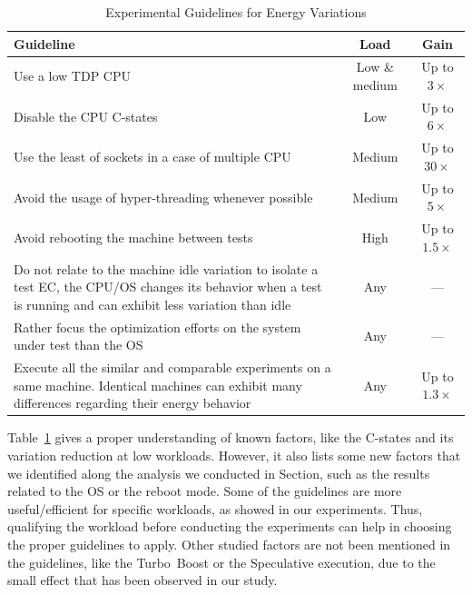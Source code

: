 \begin{table}[h!]
    \centering
    \caption{Experimental Guidelines for Energy Variations}
    \small
    \begin{tabular}{|p{4.7cm}|c|c|}
        \hline
        \textbf{Guideline}                                                                                                                                                  & \textbf{Load} & \textbf{Gain}     \\
        \hline
        \hline
        Use a low TDP CPU        & Low \& medium & Up to $3\times$   \\
        \hline
        Disable the CPU C-states & Low           & Up to $6\times$   \\
        \hline
        Use the least of sockets in a case of multiple CPU   & Medium        & Up to $30\times$\\
        \hline
        Avoid the usage of hyper-threading whenever possible & Medium        & Up to $5\times$\\
        \hline
        Avoid rebooting the machine between tests  & High & Up to $1.5\times$ \\
        \hline
        Do not relate to the machine idle variation to isolate a test EC, the CPU/OS changes its behavior when a test is running and can exhibit less variation than idle & Any & ---\\
        \hline
        Rather focus the optimization efforts on the system under test than the OS & Any           & ---               \\
        \hline
        Execute all the similar and comparable experiments on a same machine. Identical machines can exhibit many differences regarding their energy behavior             & Any           & Up to $1.3\times$ \\
        \hline
    \end{tabular}
    \label{table:guidelines}
\end{table}

Table~\ref{table:guidelines} gives a proper understanding of known factors, like the C-states and its variation reduction at low workloads.
However, it also lists some new factors that we identified along the analysis we conducted in Section, such as the results related to the OS or the reboot mode.
Some of the guidelines are more useful/efficient for specific workloads, as showed in our experiments.
Thus, qualifying the workload before conducting the experiments can help in choosing the proper guidelines to apply.
Other studied factors are not been mentioned in the guidelines, like the Turbo~Boost or the Speculative execution, due to the small effect that has been observed in our study.

